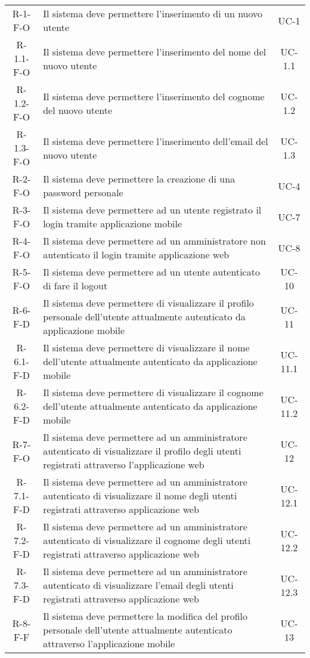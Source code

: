\begin{longtable}{ c C{9cm} c }
    R-1-F-O & Il sistema deve permettere l'inserimento di un nuovo utente & UC-1 \\
    R-1.1-F-O & Il sistema deve permettere l'inserimento del nome del nuovo utente & UC-1.1 \\
    R-1.2-F-O & Il sistema deve permettere l'inserimento del cognome del nuovo utente & UC-1.2 \\
    R-1.3-F-O & Il sistema deve permettere l'inserimento dell'email del nuovo utente & UC-1.3 \\
    R-2-F-O & Il sistema deve permettere la creazione di una password personale & UC-4 \\
    R-3-F-O & Il sistema deve permettere ad un utente registrato il login tramite applicazione mobile & UC-7 \\
    R-4-F-O & Il sistema deve permettere ad un amministratore non autenticato il login tramite applicazione web & UC-8 \\
    R-5-F-O & Il sistema deve permettere ad un utente autenticato di fare il logout & UC-10 \\
    R-6-F-D & Il sistema deve permettere di visualizzare il profilo personale dell'utente attualmente autenticato da applicazione mobile & UC-11 \\
    R-6.1-F-D & Il sistema deve permettere di visualizzare il nome dell'utente attualmente autenticato da applicazione mobile & UC-11.1 \\
    R-6.2-F-D & Il sistema deve permettere di visualizzare il cognome dell'utente attualmente autenticato da applicazione mobile & UC-11.2 \\
    R-7-F-O & Il sistema deve permettere ad un amministratore autenticato di visualizzare il profilo degli utenti registrati attraverso l'applicazione web & UC-12 \\
    R-7.1-F-D & Il sistema deve permettere ad un amministratore autenticato di visualizzare il nome degli utenti registrati attraverso applicazione web & UC-12.1 \\
    R-7.2-F-D & Il sistema deve permettere ad un amministratore autenticato di visualizzare il cognome degli utenti registrati attraverso applicazione web & UC-12.2 \\
    R-7.3-F-D & Il sistema deve permettere ad un amministratore autenticato di visualizzare l'email degli utenti registrati attraverso applicazione web & UC-12.3 \\
    R-8-F-F & Il sistema deve permettere la modifica del profilo personale dell'utente attualmente autenticato attraverso l'applicazione mobile & UC-13 \\

\end{longtable}
